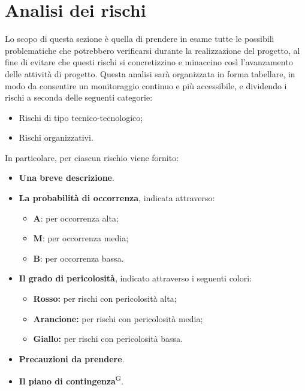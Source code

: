 \section{Analisi dei rischi}\label{sec:analisi_rischi}
Lo scopo di questa sezione è quella di prendere in esame tutte le possibili problematiche che potrebbero verificarsi durante la realizzazione del progetto, al fine di evitare che questi rischi si concretizzino e minaccino così l'avanzamento delle attività di progetto.
Questa analisi sarà organizzata in forma tabellare, in modo da consentire un monitoraggio continuo e più accessibile, e dividendo i rischi a seconda delle seguenti categorie:
\begin{itemize}
    \item Rischi di tipo tecnico-tecnologico;
    \item Rischi organizzativi.
\end{itemize}
In particolare, per ciascun rischio viene fornito:
\begin{itemize}
    \item \textbf{Una breve descrizione}.
    \item \textbf{La probabilità di occorrenza}, indicata attraverso:
        \begin{itemize}
            \item \textbf{A}: per occorrenza alta;
            \item \textbf{M}: per occorrenza media;
            \item \textbf{B}: per occorrenza bassa.
        \end{itemize}
    \item \textbf{Il grado di pericolosità}, indicato attraverso i seguenti colori:
        \begin{itemize}
        \item \colorbox{red!50}{\textbf{Rosso:}} per rischi con pericolosità alta;
        \item \colorbox{orange!50}{\textbf{Arancione:}} per rischi con pericolosità media;
        \item \colorbox{yellow!75}{\textbf{Giallo:}} per rischi con pericolosità bassa.
        \end{itemize}
    \item \textbf{Precauzioni da prendere}.
    \item \textbf{Il piano di contingenza}\textsuperscript{G}.
\end{itemize}

